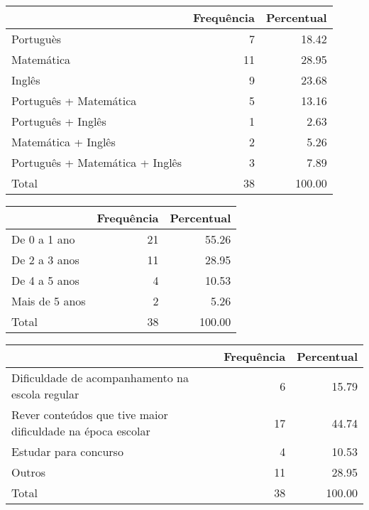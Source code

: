 \documentclass[a4paper, 12pt, openright, oneside, german, french, english, brazil, article]{abntex2}
\begin{document}
	\begin{table}[ht]
		\ibgetab{
		\centering
	}
		{\begin{tabular}{lrr}
			\hline
			& Frequência & Percentual \\ 
			\hline
			Portuguès &   7 & 18.42 \\ 
			Matemática &  11 & 28.95 \\ 
			Inglês &   9 & 23.68 \\ 
			Português + Matemática &   5 & 13.16 \\ 
			Português + Inglês &   1 & 2.63 \\ 
			Matemática + Inglês &   2 & 5.26 \\ 
			Português + Matemática + Inglês &   3 & 7.89 \\ 
			Total &  38 & 100.00 \\ 
			\hline
		\end{tabular}
	}
	{}
	\end{table}
	
	\begin{table}[ht]
		\ibgetab{
		\centering
	}
		{\begin{tabular}{lrr}
			\hline
			& Frequência & Percentual \\ 
			\hline
			De 0 a 1 ano &  21 & 55.26 \\ 
			De 2 a 3 anos &  11 & 28.95 \\ 
			De 4 a 5 anos &   4 & 10.53 \\ 
			Mais de 5 anos &   2 & 5.26 \\ 
			Total &  38 & 100.00 \\ 
			\hline
		\end{tabular}
	}
	{}
	\end{table}

	
	
	\begin{table}[ht]
		\ibgetab{
		\centering
	}
		{\begin{tabular}{p{5cm}rr}
			\hline
			& Frequência & Percentual \\ 
			\hline
			Dificuldade de acompanhamento na escola regular &   6 & 15.79 \\ 
			Rever conteúdos que tive maior dificuldade na época escolar &  17 & 44.74 \\ 
			Estudar para concurso &   4 & 10.53 \\ 
			Outros &  11 & 28.95 \\ 
			Total &  38 & 100.00 \\ 
			\hline
		\end{tabular}
	}
	{}
	\end{table}
	
	
	
	
	
	
	
	
	
	
\end{document}
